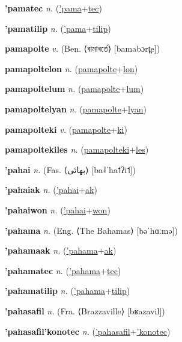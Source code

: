 \textbf{\hypertarget{'pamatec}{'pamatec}} \textit{n.} (\hyperlink{'pama}{'pama}+\allowbreak \hyperlink{tec}{tec})


\textbf{\hypertarget{'pamatilip}{'pamatilip}} \textit{n.} (\hyperlink{'pama}{'pama}+\allowbreak \hyperlink{tilip}{tilip})


\textbf{\hypertarget{pamapolte}{pamapolte}} \textit{v.} (Ben. ⟨{\bengali{}বামাবর্তে}⟩ [bamabɔrt̪e])


\textbf{\hypertarget{pamapoltelon}{pamapoltelon}} \textit{n.} (\hyperlink{pamapolte}{pamapolte}+\allowbreak \hyperlink{lon}{lon})


\textbf{\hypertarget{pamapoltelum}{pamapoltelum}} \textit{n.} (\hyperlink{pamapolte}{pamapolte}+\allowbreak \hyperlink{lum}{lum})


\textbf{\hypertarget{pamapoltelyan}{pamapoltelyan}} \textit{n.} (\hyperlink{pamapolte}{pamapolte}+\allowbreak \hyperlink{lyan}{lyan})


\textbf{\hypertarget{pamapolteki}{pamapolteki}} \textit{v.} (\hyperlink{pamapolte}{pamapolte}+\allowbreak \hyperlink{ki}{ki})


\textbf{\hypertarget{pamapoltekiles}{pamapoltekiles}} \textit{n.} (\hyperlink{pamapolteki}{pamapolteki}+\allowbreak \hyperlink{les}{les})


\textbf{\hypertarget{'pahai}{'pahai}} \textit{n.} (Fas. ⟨{\arabics{}بهائی‎}⟩ [ba˨ˈha˦ʔi˦])


\textbf{\hypertarget{'pahaiak}{'pahaiak}} \textit{n.} (\hyperlink{'pahai}{'pahai}+\allowbreak \hyperlink{ak}{ak})


\textbf{\hypertarget{'pahaiwon}{'pahaiwon}} \textit{n.} (\hyperlink{'pahai}{'pahai}+\allowbreak \hyperlink{won}{won})


\textbf{\hypertarget{'pahama}{'pahama}} \textit{n.} (Eng. ⟨The Bahamas⟩ [bəˈhɑːmə])


\textbf{\hypertarget{'pahamaak}{'pahamaak}} \textit{n.} (\hyperlink{'pahama}{'pahama}+\allowbreak \hyperlink{ak}{ak})


\textbf{\hypertarget{'pahamatec}{'pahamatec}} \textit{n.} (\hyperlink{'pahama}{'pahama}+\allowbreak \hyperlink{tec}{tec})


\textbf{\hypertarget{'pahamatilip}{'pahamatilip}} \textit{n.} (\hyperlink{'pahama}{'pahama}+\allowbreak \hyperlink{tilip}{tilip})


\textbf{\hypertarget{'pahasafil}{'pahasafil}} \textit{n.} (Fra. ⟨Brazzaville⟩ [bʁazavil])


\textbf{\hypertarget{'pahasafil'konotec}{'pahasafil'konotec}} \textit{n.} (\hyperlink{'pahasafil}{'pahasafil}+\allowbreak \hyperlink{'konotec}{'konotec})


